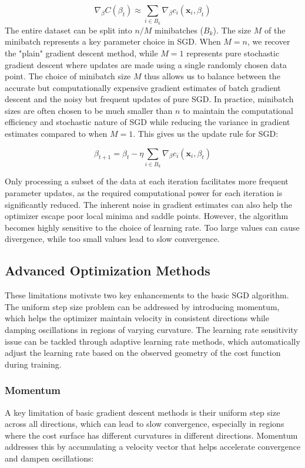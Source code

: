 \documentclass[aps,pra,english,notitlepage,reprint,nofootinbib]{revtex4-1}  %
\begin{document}
\begin{equation}
    \nabla_\beta C(\beta_t) \approx \sum_{i \in B_k}\nabla_\beta c_i(\mathbf{x}_i, \beta_t)
\end{equation}
The entire dataset can be split into \( n/M \) minibatches (\( B_k \)). The size \( M \) of the minibatch represents a key parameter choice in SGD. When \( M = n \), we recover the "plain" gradient descent method, while \( M = 1 \) represents pure stochastic gradient descent where updates are made using a single randomly chosen data point. The choice of minibatch size \( M \) thus allows us to balance between the accurate but computationally expensive gradient estimates of batch gradient descent and the noisy but frequent updates of pure SGD. In practice, minibatch sizes are often chosen to be much smaller than \( n \) to maintain the computational efficiency and stochastic nature of SGD while reducing the variance in gradient estimates compared to when \( M = 1 \). This gives us the update rule for SGD:

\begin{equation}
    \beta_{t+1} = \beta_t - \eta \sum_{i \in B_k} \nabla_\beta c_i(\mathbf{x}_i, \beta_t)
\end{equation}


Only processing a subset of the data at each iteration facilitates more frequent parameter updates, as the required computational power for each iteration is significantly reduced. The inherent noise in gradient estimates can also help the optimizer escape poor local minima and saddle points. However, the algorithm becomes highly sensitive to the choice of learning rate. Too large values can cause divergence, while too small values lead to slow convergence.

\subsection{Advanced Optimization Methods}

These limitations motivate two key enhancements to the basic SGD algorithm. The uniform step size problem can be addressed by introducing momentum, which helps the optimizer maintain velocity in consistent directions while damping oscillations in regions of varying curvature. The learning rate sensitivity issue can be tackled through adaptive learning rate methods, which automatically adjust the learning rate based on the observed geometry of the cost function during training. 

\subsubsection{Momentum}
A key limitation of basic gradient descent methods is their uniform step size across all directions, which can lead to slow convergence, especially in regions where the cost surface has different curvatures in different directions. Momentum addresses this by accumulating a velocity vector that helps accelerate convergence and dampen oscillations:
\end{document}
